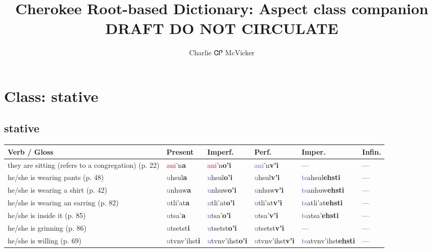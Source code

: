 \documentclass[oneside,openany]{book}%
\title{Cherokee Root-based Dictionary: Aspect class companion\\[1ex]\large DRAFT DO NOT CIRCULATE}%
\author{Charlie ᏣᎵ McVicker}%
\begin{document}
%
\normalsize%
\maketitle%
\tableofcontents%
\newpage%
\needspace{3in}%
\section*{Class: stative}%
%
\needspace{1in}%
\subsection*{stative}%
\begin{tabularx}{\textwidth}{>{\hsize=1.5\hsize\RaggedRight}X >{\hsize=0.9\hsize}X >{\hsize=0.9\hsize}X >{\hsize=0.9\hsize}X >{\hsize=0.9\hsize}X >{\hsize=0.9\hsize}X}%
\toprule%
\textbf{Verb / Gloss}&\textbf{Present}&\textbf{Imperf.}&\textbf{Perf.}&\textbf{Imper.}&\textbf{Infin.}\\%
\midrule%
they are sitting (refers to a congregation) (p. 22)&\textcolor{Red}{ani}'n\textbf{a}&\textcolor{Red}{ani}'n\textbf{o'i}&\textcolor{RoyalBlue}{ani}'n\textbf{v'i}&---&---\\%
he/she is wearing pants (p. 48)&\textcolor{RoyalBlue}{u}hsul\textbf{a}&\textcolor{RoyalBlue}{u}hsul\textbf{o'i}&\textcolor{RoyalBlue}{u}hsul\textbf{v'i}&\textcolor{RoyalBlue}{ts}ahsul\textbf{ehsti}&---\\%
he/she is wearing a shirt (p. 42)&\textcolor{RoyalBlue}{u}nhuw\textbf{a}&\textcolor{RoyalBlue}{u}nhuw\textbf{o'i}&\textcolor{RoyalBlue}{u}nhuw\textbf{v'i}&\textcolor{RoyalBlue}{ts}anhuw\textbf{ehsti}&---\\%
he/she is wearing an earring (p. 82)&\textcolor{RoyalBlue}{u}tli'at\textbf{a}&\textcolor{RoyalBlue}{u}tli'at\textbf{o'i}&\textcolor{RoyalBlue}{u}tli'at\textbf{v'i}&\textcolor{RoyalBlue}{ts}atli'at\textbf{ehsti}&---\\%
he/she is inside it (p. 85)&\textcolor{RoyalBlue}{u}tsa'\textbf{a}&\textcolor{RoyalBlue}{u}tsa'\textbf{o'i}&\textcolor{RoyalBlue}{u}tsa'\textbf{v'i}&\textcolor{RoyalBlue}{ts}atsa'\textbf{ehsti}&---\\%
he/she is grinning (p. 86)&\textcolor{RoyalBlue}{u}tsetst\textbf{i}&\textcolor{RoyalBlue}{u}tsetst\textbf{o'i}&\textcolor{RoyalBlue}{u}tsetst\textbf{v'i}&---&---\\%
he/she is willing (p. 69)&\textcolor{RoyalBlue}{u}tvnv'ihst\textbf{i}&\textcolor{RoyalBlue}{u}tvnv'ihst\textbf{o'i}&\textcolor{RoyalBlue}{u}tvnv'ihst\textbf{v'i}&\textcolor{RoyalBlue}{ts}atvnv'ihst\textbf{ehsti}&---\\%

\end{tabularx}
\end{document}

